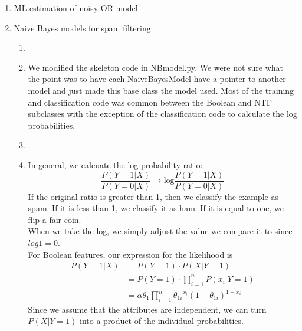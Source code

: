 \documentclass{article}
\begin{document}
\begin{enumerate}
    \item ML estimation of noisy-OR model %
    
    \item Naive Bayes models for spam filtering %
        \begin{enumerate}
            \item %
            \item %
                We modified the skeleton code in NBmodel.py. We were not
                sure what the point was to have each NaiveBayesModel have
                a pointer to another model and just made this base class the
                model used. Most of the training and classification code was
                common between the Boolean and NTF subclasses with the
                exception of the classification code to calculate the log
                probabilities. \\
            \item %
            \item %
                In general, we calcuate the log probability ratio:
                \begin{equation*}
                    \frac{P(Y=1|X)}{P(Y=0|X)} \rightarrow
                    \text{log}\frac{P(Y=1|X)}{P(Y=0|X)} 
                \end{equation*}
                If the original ratio is greater than 1, then we classify
                the example as spam. If it is less than 1, we classify it 
                as ham. If it is equal to one, we flip a fair coin. \\
                When we take the log, we simply adjust the value we compare
                it to since \(log1=0\). \\
                For Boolean features, our expression for the likelihood is
                \begin{align*}
                    P(Y=1|X)
                        &= P(Y=1) \cdot P(X|Y=1) \\
                        &= P(Y=1) \cdot \prod\limits_{i=1}^n P(x_i|Y=1) \\
                        &= \alpha \theta_1 \prod\limits_{i=1}^n 
                            {\theta_{1i}}^{x_i}(1-\theta_{1i})^{1-x_i}
                \end{align*}
                Since we assume that the attributes are independent, we can
                turn \(P(X|Y=1)\) into a product of the individual
                probabilities. \\

\end{enumerate}
\end{enumerate}
\end{document}
